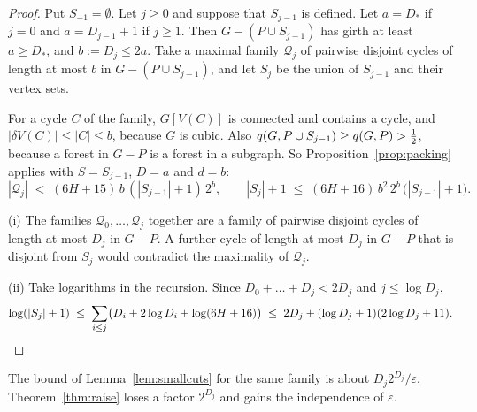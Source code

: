 \begin{proof}
Put $S_{-1}=\emptyset$. Let $j\ge0$ and suppose that $S_{j-1}$ is defined. Let $a=D_{*}$ if $j=0$ and
$a=D_{j-1}+1$ if $j\ge1$. Then $G-(P\cup S_{j-1})$ has girth at least $a\ge D_{*}$, and
$b:=D_j\le2a$. Take a maximal family $\mathcal Q_j$ of pairwise disjoint cycles of length at most
$b$ in $G-(P\cup S_{j-1})$, and let $S_j$ be the union of $S_{j-1}$ and their vertex sets.

For a cycle $C$ of the family, $G[V(C)]$ is connected and contains a cycle, and
$|\delta V(C)|\le|C|\le b$, because $G$ is cubic. Also
$q(G,P\cup S_{j-1})\ge q(G,P)>\tfrac12$, because a forest in $G-P$ is a forest in a subgraph. So
Proposition~\ref{prop:packing} applies with $S=S_{j-1}$, $D=a$ and $d=b$:
\[
  |\mathcal Q_j|\;<\;(6H+15)\,b\,(|S_{j-1}|+1)\,2^{b},\qquad
  |S_j|+1\;\le\;(6H+16)\,b^{2}\,2^{b}\,\bigl(|S_{j-1}|+1\bigr).
\]

(i) The families $\mathcal Q_0,\dots,\mathcal Q_j$ together are a family of pairwise disjoint
cycles of length at most $D_j$ in $G-P$. A further cycle of length at most $D_j$ in $G-P$ that is
disjoint from $S_j$ would contradict the maximality of $\mathcal Q_j$.

(ii) Take logarithms in the recursion. Since $D_0+\dots+D_j<2D_j$ and $j\le\log D_j$,
\[
  \log(|S_j|+1)\;\le\;\sum_{i\le j}\bigl(D_i+2\log D_i+\log(6H+16)\bigr)
  \;\le\;2D_j+(\log D_j+1)(2\log D_j+11).\qedhere
\]
\end{proof}

The bound of Lemma~\ref{lem:smallcuts} for the same family is about $D_j2^{D_j}/\varepsilon$.
Theorem~\ref{thm:raise} loses a factor $2^{D_j}$ and gains the independence of $\varepsilon$.
